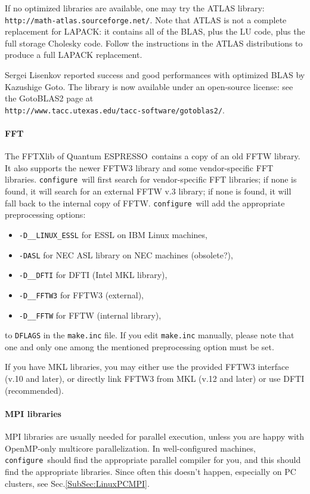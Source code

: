 \documentclass[12pt,a4paper]{article}
\def\qe{{\sc Quantum ESPRESSO}}
\def\configure{\texttt{configure}}
\begin{document}
If no optimized libraries are available, one may try the ATLAS library:
\texttt{http://math-atlas.sourceforge.net/}. Note that ATLAS is not
a complete replacement for LAPACK: it contains all of the BLAS, plus the
LU code, plus the full storage Cholesky code. Follow the instructions in the
ATLAS distributions to produce a full LAPACK replacement.

Sergei Lisenkov reported success and good performances with optimized
BLAS by Kazushige Goto. The library is now available under an
open-source license: see the GotoBLAS2 page at \\
\texttt{http://www.tacc.utexas.edu/tacc-software/gotoblas2/}.

\paragraph{FFT}
The FFTXlib of \qe\ contains a copy of an old FFTW library.
It also supports
the newer FFTW3 library and some vendor-specific FFT libraries.
\configure\ will first search for vendor-specific FFT libraries;
if none is found, it will search for an external FFTW v.3 library;
if none is found, it will fall back to the internal  copy of FFTW.
\configure\ will add the appropriate preprocessing options:
\begin{itemize}
\item \texttt{-D\_\_LINUX\_ESSL} for ESSL on IBM Linux machines,
\item \texttt{-DASL} for NEC ASL library on NEC machines (obsolete?),
\item \texttt{-D\_\_DFTI}  for DFTI (Intel MKL library),
\item \texttt{-D\_\_FFTW3} for FFTW3 (external),
\item \texttt{-D\_\_FFTW}  for FFTW (internal library),
\end{itemize}
to \texttt{DFLAGS} in the \texttt{make.inc} file.
If you edit \texttt{make.inc} manually, please note that one and
only one among the mentioned preprocessing option must be set.

If you have MKL libraries, you may either use the provided FFTW3
interface (v.10 and later), or directly link FFTW3 from MKL (v.12
and later) or use DFTI (recommended).

\paragraph{MPI libraries}
MPI libraries are usually needed for parallel execution, unless you are
happy with OpenMP-only multicore parallelization.
In well-configured machines, \configure\ should find the appropriate
parallel compiler for you, and this should find the appropriate
libraries. Since often this doesn't
happen, especially on PC clusters, see Sec.\ref{SubSec:LinuxPCMPI}.
\end{document}
